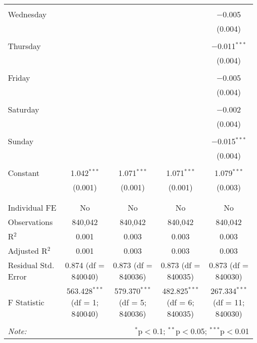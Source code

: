 \documentclass[
]{article}
\begin{document}
\begin{table}[!htbp]
{\begin{tabular}{@{\extracolsep{5pt}}lcccc}
  & & & & \\ 
 Wednesday &  &  &  & $-$0.005 \\ 
  &  &  &  & (0.004) \\ 
  & & & & \\ 
 Thursday &  &  &  & $-$0.011$^{***}$ \\ 
  &  &  &  & (0.004) \\ 
  & & & & \\ 
 Friday &  &  &  & $-$0.005 \\ 
  &  &  &  & (0.004) \\ 
  & & & & \\ 
 Saturday &  &  &  & $-$0.002 \\ 
  &  &  &  & (0.004) \\ 
  & & & & \\ 
 Sunday &  &  &  & $-$0.015$^{***}$ \\ 
  &  &  &  & (0.004) \\ 
  & & & & \\ 
 Constant & 1.042$^{***}$ & 1.071$^{***}$ & 1.071$^{***}$ & 1.079$^{***}$ \\ 
  & (0.001) & (0.001) & (0.001) & (0.003) \\ 
  & & & & \\ 
\hline \\[-1.8ex] 
Individual FE & No & No & No & No \\ 
Observations & 840,042 & 840,042 & 840,042 & 840,042 \\ 
R$^{2}$ & 0.001 & 0.003 & 0.003 & 0.003 \\ 
Adjusted R$^{2}$ & 0.001 & 0.003 & 0.003 & 0.003 \\ 
Residual Std. Error & 0.874 (df = 840040) & 0.873 (df = 840036) & 0.873 (df = 840035) & 0.873 (df = 840030) \\ 
F Statistic & 563.428$^{***}$ (df = 1; 840040) & 579.370$^{***}$ (df = 5; 840036) & 482.825$^{***}$ (df = 6; 840035) & 267.334$^{***}$ (df = 11; 840030) \\ 
\hline 
\hline \\[-1.8ex] 
\textit{Note:}  & \multicolumn{4}{r}{$^{*}$p$<$0.1; $^{**}$p$<$0.05; $^{***}$p$<$0.01} \\ 
\end{tabular}
} 
\end{table} 
\newpage
\end{document}
